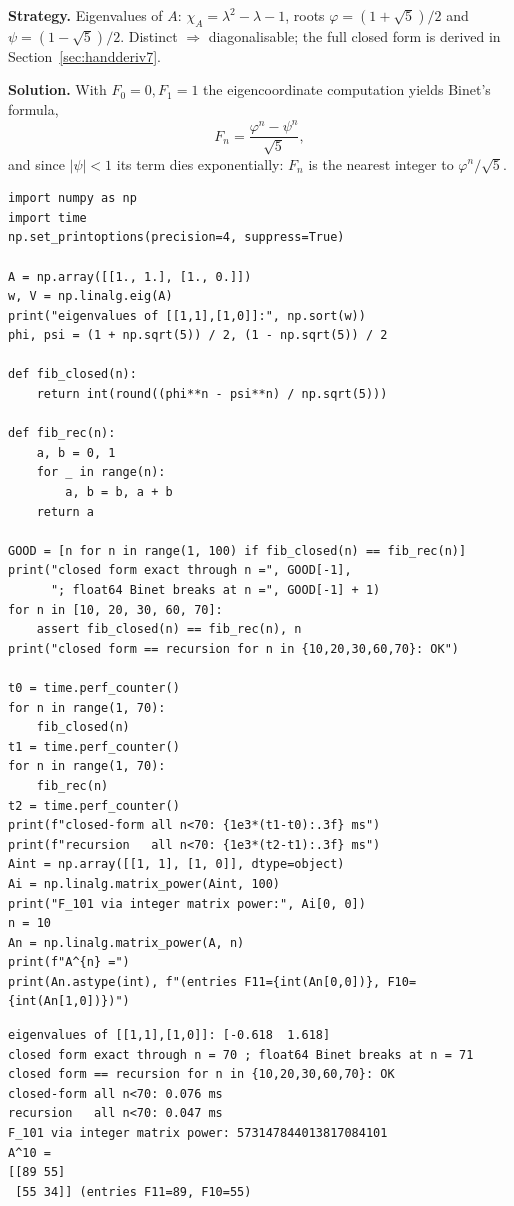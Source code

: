 \begin{example}\label{ex:fib}
\textbf{Strategy.} Eigenvalues of $A$: $\chi_A=\lambda^2-\lambda-1$,
roots $\varphi=(1+\sqrt5)/2$ and $\psi=(1-\sqrt5)/2$. Distinct $\Rightarrow$
diagonalisable; the full closed form is derived in
Section~\ref{sec:handderiv7}.

\textbf{Solution.} With $F_0=0,F_1=1$ the eigencoordinate computation
yields Binet's formula,
\[
F_n=\frac{\varphi^{n}-\psi^{n}}{\sqrt5},
\]
and since $|\psi|<1$ its term dies exponentially: $F_n$ is the nearest
integer to $\varphi^{n}/\sqrt5$.
\end{example}

\begin{lstlisting}[caption={\ttfamily code/ch07\_fibonacci.py --- Binet's
formula checked against the recursion, timed, and pushed past its float
limit by an integer matrix power.}]
import numpy as np
import time
np.set_printoptions(precision=4, suppress=True)

A = np.array([[1., 1.], [1., 0.]])
w, V = np.linalg.eig(A)
print("eigenvalues of [[1,1],[1,0]]:", np.sort(w))
phi, psi = (1 + np.sqrt(5)) / 2, (1 - np.sqrt(5)) / 2

def fib_closed(n):
    return int(round((phi**n - psi**n) / np.sqrt(5)))

def fib_rec(n):
    a, b = 0, 1
    for _ in range(n):
        a, b = b, a + b
    return a

GOOD = [n for n in range(1, 100) if fib_closed(n) == fib_rec(n)]
print("closed form exact through n =", GOOD[-1],
      "; float64 Binet breaks at n =", GOOD[-1] + 1)
for n in [10, 20, 30, 60, 70]:
    assert fib_closed(n) == fib_rec(n), n
print("closed form == recursion for n in {10,20,30,60,70}: OK")

t0 = time.perf_counter()
for n in range(1, 70):
    fib_closed(n)
t1 = time.perf_counter()
for n in range(1, 70):
    fib_rec(n)
t2 = time.perf_counter()
print(f"closed-form all n<70: {1e3*(t1-t0):.3f} ms")
print(f"recursion   all n<70: {1e3*(t2-t1):.3f} ms")
Aint = np.array([[1, 1], [1, 0]], dtype=object)
Ai = np.linalg.matrix_power(Aint, 100)
print("F_101 via integer matrix power:", Ai[0, 0])
n = 10
An = np.linalg.matrix_power(A, n)
print(f"A^{n} =")
print(An.astype(int), f"(entries F11={int(An[0,0])}, F10={int(An[1,0])})")
\end{lstlisting}

\begin{lstlisting}[caption={Output of the Fibonacci check. Notice float64
Binet holds only to $n=70$ --- past that the $\varphi^{n}$ term outgrows
precision; integer matrix powers stay exact forever. (Timing is a wash at
this $n$; both are cheap --- the point is the \emph{form} exists at all.)}]
eigenvalues of [[1,1],[1,0]]: [-0.618  1.618]
closed form exact through n = 70 ; float64 Binet breaks at n = 71
closed form == recursion for n in {10,20,30,60,70}: OK
closed-form all n<70: 0.076 ms
recursion   all n<70: 0.047 ms
F_101 via integer matrix power: 573147844013817084101
A^10 =
[[89 55]
 [55 34]] (entries F11=89, F10=55)
\end{lstlisting}


